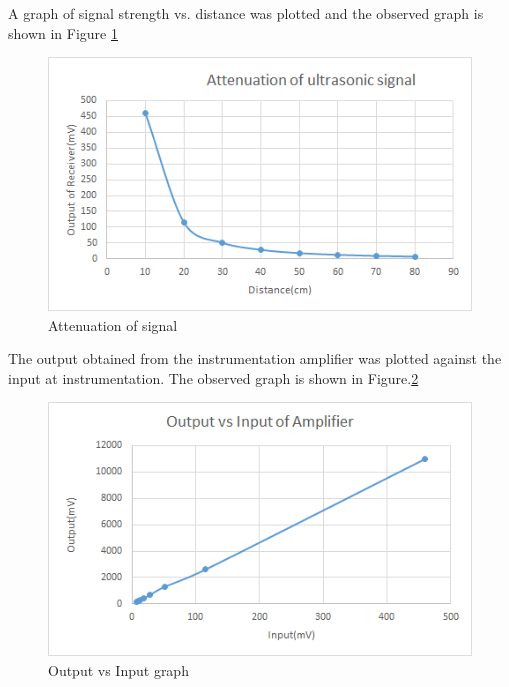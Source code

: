 A graph of signal strength vs. distance was plotted and the observed graph is shown in Figure \ref{fig:Attenuation}
\begin{figure}[htpb]
	\centering
	\includegraphics[scale=1]{Images/AttenuationGraph.png}
	\caption{Attenuation of signal}
	\label{fig:Attenuation}
\end{figure}

The output obtained from the instrumentation amplifier was plotted against the input at instrumentation. The observed graph is shown in Figure.\ref{fig:InputOutputGraph}
\begin{figure}[htpb]
	\centering
	\includegraphics[scale=1]{Images/OutputvsInput.png}
	\caption{Output vs Input graph}
	\label{fig:InputOutputGraph}
\end{figure}


